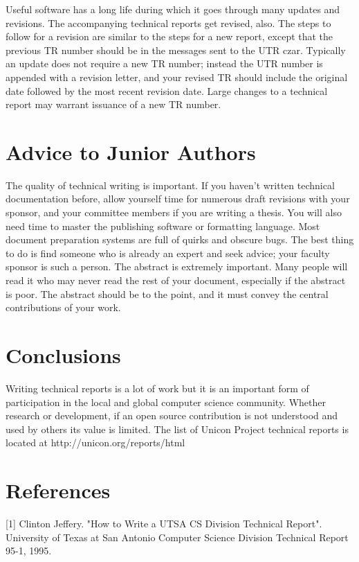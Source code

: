 \documentclass[letterpaper,12pt]{article}
\begin{document}
Useful software has a long life during which it goes through many
updates and revisions. The accompanying technical reports get revised,
also. The steps to follow for a revision are similar to the steps for
a new report, except that the previous TR number should be in the
messages sent to the UTR czar. Typically an update does not require a
new TR number; instead the UTR number is appended with a revision
letter, and your revised TR should include the original date
followed by the most recent revision date. Large changes to a
technical report may warrant issuance of a new TR number.

\section{Advice to Junior Authors}

The quality of technical writing is important. If you haven't written
technical documentation before, allow yourself time for numerous draft
revisions with your sponsor, and your committee members if you
are writing a thesis. You will also need time to master the
publishing software or formatting language. Most document preparation
systems are full of quirks and obscure bugs. The best thing to do is
find someone who is already an expert and seek advice; your faculty
sponsor is such a person.
The abstract is extremely important. Many people will read it
who may never read the rest of your document, especially if the
abstract is poor. The abstract should be to the point, and
it must convey the central contributions of your work.

\section{Conclusions}

Writing technical reports is a lot of work but it is an important form
of participation in the local and global computer science community.
Whether research or development, if an open source contribution is
not understood and used by others its value is limited.
The list of Unicon Project technical reports is located at
http://unicon.org/reports/html

\section*{References}

[1] Clinton Jeffery. "How to Write a UTSA CS Division Technical
Report". University of Texas at San Antonio Computer Science Division
Technical Report 95-1, 1995.
\end{document}
